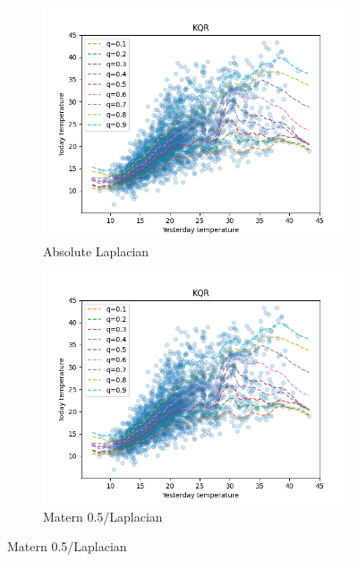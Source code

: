 \begin{figure}[!h]
    \begin{subfigure}[b]{0.5\linewidth}
        \centering
        \includegraphics[width=1.1\textwidth]{images/melbourne_a_laplacian_kernel_quantile_regression.png} 
        \caption{Absolute Laplacian} 
        \label{} 
        \vspace{4ex}
    \end{subfigure}%
    \begin{subfigure}[b]{0.5\linewidth}
        \centering
        \includegraphics[width=1.1\textwidth]{images/melbourne_matern_0.5_kernel_quantile_regression.png} 
        \caption{Matern 0.5/Laplacian} 
        \label{} 
        \vspace{4ex}

\end{subfigure}
\end{figure}
